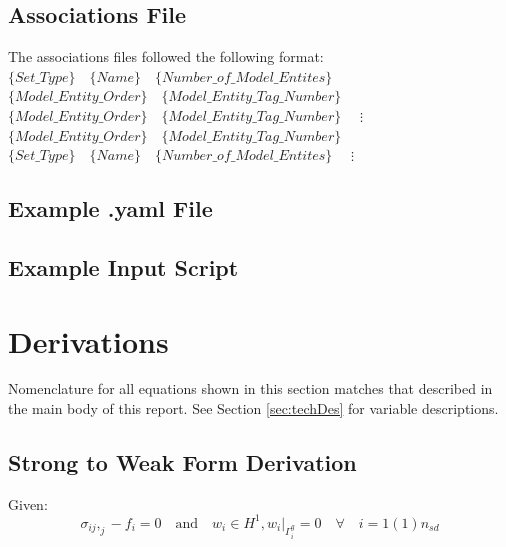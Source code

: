 \documentclass[a4paper, 12pt]{article}
\begin{document}
\subsection{Associations File} \label{subsec:ExAssoc}
The associations files followed the following format:
\newline
$\{Set\_Type\} \quad  \{Name\} \quad  \{Number\_of\_Model\_Entites\} \quad $
\newline
$\{Model\_Entity\_Order\} \quad  \{Model\_Entity\_Tag\_Number\} \quad $
\newline
$\{Model\_Entity\_Order\} \quad  \{Model\_Entity\_Tag\_Number\} \quad $
\newline
$\vdots$
\newline
$\{Model\_Entity\_Order\} \quad  \{Model\_Entity\_Tag\_Number\} \quad $
\newline
$\{Set\_Type\} \quad  \{Name\} \quad  \{Number\_of\_Model\_Entites\} \quad $
\newline
$\vdots$
\newline


\newpage
\subsection{Example .yaml File} \label{subsec:ExYaml}


\newpage
\subsection{Example Input Script} \label{subsec:ExIn}


\newpage
\section{Derivations} \label{sec:Derivations}

Nomenclature for all equations shown in this section
matches that described in the main body of this report.
See Section \ref{sec:techDes} for variable descriptions.

\subsection{Strong to Weak Form Derivation} \label{sec:WeakDer}

Given:
\begin{equation*}
\sigma_{ij},_{j} - f_{i} = 0 \quad \text{and} \quad
w_{i} \in H^1, w_{i}\Big|_{\Gamma^{g}_{i}} = 0
    \quad \forall \quad i=1(1)n_{sd}
\end{equation*}
\end{document}
